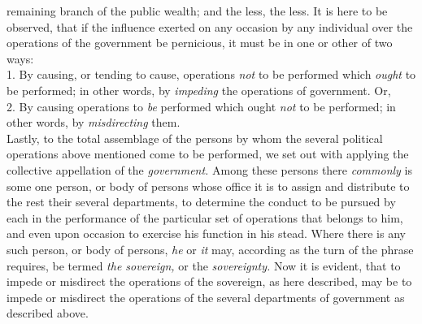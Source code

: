 \documentclass[12pt]{report}
\begin{document}
remaining branch of the public wealth; and the less, the less. It is
here to be observed, that if the influence exerted on any occasion by
any individual over the operations of the government be pernicious, it
must be in one or other of two ways:\\
1. By causing, or tending to cause, operations \emph{not} to be
performed which \emph{ought} to be performed; in other words, by
\emph{impeding} the operations of government. Or,\\
2. By causing operations to \emph{be} performed which ought \emph{not}
to be performed; in other words, by \emph{misdirecting} them.\\
Lastly, to the total assemblage of the persons by whom the several
political operations above mentioned come to be performed, we set out
with applying the collective appellation of the \emph{government.} Among
these persons there \emph{commonly} is some one person, or body of
persons whose office it is to assign and distribute to the rest their
several departments, to determine the conduct to be pursued by each in
the performance of the particular set of operations that belongs to him,
and even upon occasion to exercise his function in his stead. Where
there is any such person, or body of persons, \emph{he} or \emph{it}
may, according as the turn of the phrase requires, be termed \emph{the
sovereign,} or the \emph{sovereignty.} Now it is evident, that to impede
or misdirect the operations of the sovereign, as here described, may be
to impede or misdirect the operations of the several departments of
government as described above.
\end{document}
